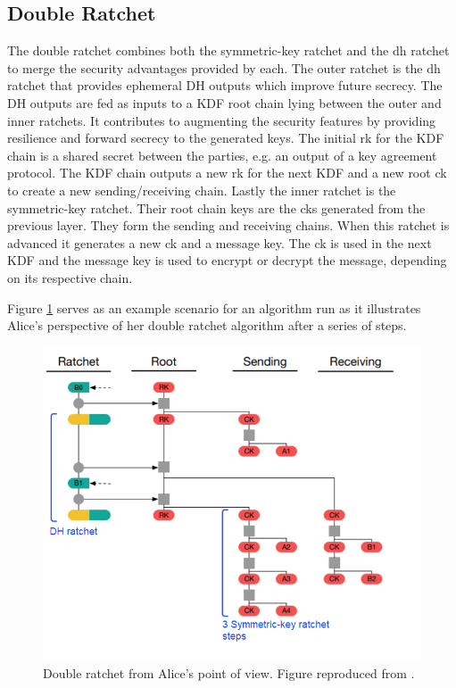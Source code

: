 \subsection{Double Ratchet}
The double ratchet combines both the symmetric-key ratchet and the \gls{dh} ratchet to merge the security advantages provided by each. The outer ratchet is the \gls{dh} ratchet that provides ephemeral DH outputs which improve future secrecy. The DH outputs are fed as inputs to a KDF root chain lying between the outer and inner ratchets. It contributes to augmenting the security features by providing resilience and forward secrecy to the generated keys. The initial \gls{rk} for the KDF chain is a shared secret between the parties, e.g. an output of a key agreement protocol. The KDF chain outputs a new \gls{rk} for the next KDF and a new root \gls{ck} to create a new sending/receiving chain. Lastly the inner ratchet is the symmetric-key ratchet. Their root chain keys are the \gls{ck}s generated from the previous layer. They form the sending and receiving chains. When this ratchet is advanced it generates a new \gls{ck} and a message key. The \gls{ck} is used in the next KDF and the message key is used to encrypt or decrypt the message, depending on its respective chain. 
\par
Figure \ref{fig:AliceDR} serves as an example scenario for an algorithm run as it illustrates Alice's perspective of her double ratchet algorithm after a series of steps. 
\begin{figure}[hptb]
	\centering
	\includegraphics[scale=0.48]{Images/dr.png}
	\caption{Double ratchet from Alice's point of view. Figure reproduced from \cite{dblRtcht}.}
	\label{fig:AliceDR}
\end{figure}
